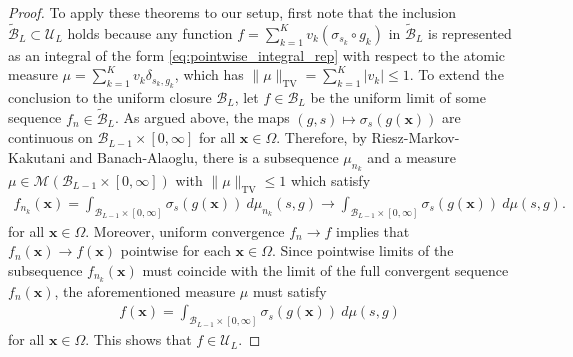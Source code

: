 \documentclass{article}
\DeclareMathOperator{\TV}{TV}
\def\vx{{\bm{x}}}
\def\cB{{\mathcal{B}}}
\def\cM{{\mathcal{M}}}
\def\cU{{\mathcal{U}}}
\begin{document}
\begin{appendices}
\begin{proof}
To apply these theorems to our setup, first note that the inclusion $\widetilde{\cB}_L \subset \cU_L$ holds because any function $f = \sum_{k=1}^K v_k (\sigma_{s_k} \circ g_k)$ in $\widetilde{\cB}_L$ is represented as an integral of the form \eqref{eq:pointwise_integral_rep} with respect to the atomic measure $\mu = \sum_{k=1}^K v_k \delta_{s_k,g_k}$, which has $\| \mu \|_{\TV} = \sum_{k=1}^K |v_k| \leq 1$. To extend the conclusion to the uniform closure $\cB_L$, let $f \in \cB_L$ be the uniform limit of some sequence $f_n \in \widetilde{\cB}_L$. As argued above, the maps $(g,s) \mapsto \sigma_s(g(\vx))$ are continuous on $\cB_{L-1} \times [0,\infty]$ for all $\vx \in \Omega$. Therefore, by Riesz-Markov-Kakutani and Banach-Alaoglu, there is a subsequence $\mu_{n_k}$ and a measure $\mu \in \cM(\cB_{L-1} \times [0,\infty])$ with $\| \mu \|_{\TV} \leq 1$ which satisfy
\begin{align}
    f_{n_k}(\vx) = \int_{\cB_{L-1} \times [0,\infty]} \sigma_s(g(\vx)) \ d \mu_{n_k}(s,g) \to \int_{\cB_{L-1} \times [0,\infty]} \sigma_s(g(\vx)) \ d \mu(s,g).
\end{align}
for all $\vx \in \Omega$. Moreover, uniform convergence $f_n \to f$ implies that $f_n(\vx) \to f(\vx)$ pointwise for each $\vx \in \Omega$. Since pointwise limits of the subsequence $f_{n_k} (\vx)$ must coincide with the limit of the full convergent sequence $f_n(\vx)$, the aforementioned measure $\mu$ must satisfy
\begin{align}
    f(\vx) = \int_{\cB_{L-1} \times [0,\infty]} \sigma_s (g(\vx)) \ d \mu(s,g)
\end{align}
for all $\vx \in \Omega$. This shows that $f \in \cU_L$.


\end{proof}
\end{appendices}
\end{document}
